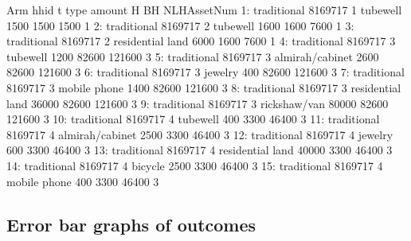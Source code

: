 \begin{Schunk}
\begin{Soutput}
            Arm    hhid t             type amount     H     BH NLHAssetNum
 1: traditional 8169717 1         tubewell   1500  1500   1500           1
 2: traditional 8169717 2         tubewell   1600  1600   7600           1
 3: traditional 8169717 2 residential land   6000  1600   7600           1
 4: traditional 8169717 3         tubewell   1200 82600 121600           3
 5: traditional 8169717 3  almirah/cabinet   2600 82600 121600           3
 6: traditional 8169717 3          jewelry    400 82600 121600           3
 7: traditional 8169717 3     mobile phone   1400 82600 121600           3
 8: traditional 8169717 3 residential land  36000 82600 121600           3
 9: traditional 8169717 3     rickshaw/van  80000 82600 121600           3
10: traditional 8169717 4         tubewell    400  3300  46400           3
11: traditional 8169717 4  almirah/cabinet   2500  3300  46400           3
12: traditional 8169717 4          jewelry    600  3300  46400           3
13: traditional 8169717 4 residential land  40000  3300  46400           3
14: traditional 8169717 4          bicycle   2500  3300  46400           3
15: traditional 8169717 4     mobile phone    400  3300  46400           3
\end{Soutput}
\end{Schunk}


\subsection{Error bar graphs of outcomes}







